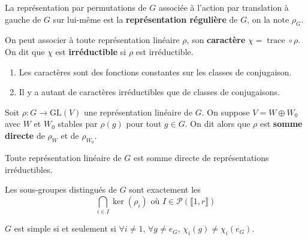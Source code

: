   \begin{definition}
    La représentation par permutations de $G$ associée à l'action par translation à gauche de $G$ sur lui-même est la \textbf{représentation régulière} de $G$, on la note $\rho_G$.
  \end{definition}


  \begin{definition}
    On peut associer à toute représentation linéaire $\rho$, son \textbf{caractère} $\chi = \operatorname{trace} \circ \rho$. On dit que $\chi$ est \textbf{irréductible} si $\rho$ est irréductible.
  \end{definition}

  \begin{proposition}
    \begin{enumerate}[label={\bfseries(\roman*)}]
      \item Les caractères sont des fonctions constantes sur les classes de conjugaison.
      \item Il y a autant de caractères irréductibles que de classes de conjugaisons.
    \end{enumerate}
  \end{proposition}

  \begin{definition}
    Soit $\rho : G \rightarrow \mathrm{GL}(V)$ une représentation linéaire de $G$. On suppose $V = W \oplus W_0$ avec $W$ et $W_0$ stables par $\rho(g)$ pour tout $g \in G$. On dit alors que $\rho$ est \textbf{somme directe} de $\rho_W$ et de $\rho_{W_0}$.
  \end{definition}

  \begin{theorem}
    Toute représentation linéaire de $G$ est somme directe de représentations irréductibles.
  \end{theorem}


  \begin{theorem}
    Les sous-groupes distingués de $G$ sont exactement les
    \[ \bigcap_{i \in I} \ker(\rho_i) \text{ où } I \in \mathcal{P}(\llbracket 1, r \rrbracket) \]
  \end{theorem}

  \begin{corollary}
    $G$ est simple si et seulement si $\forall i \neq 1$, $\forall g \neq e_G$, $\chi_i(g) \neq \chi_i(e_G)$.
  \end{corollary}

